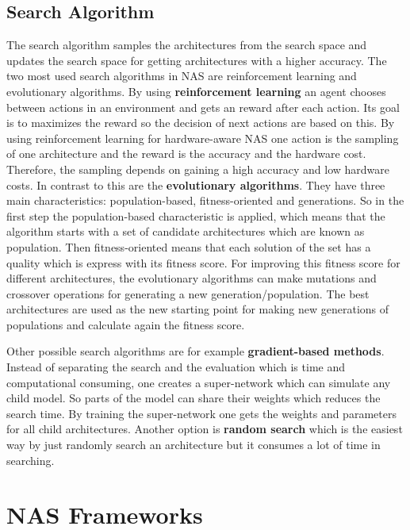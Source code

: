 \documentclass[conference]{IEEEtran}
\begin{document}
\subsection{Search Algorithm}
The search algorithm samples the architectures from the search space and updates the search space for getting architectures with a higher accuracy.
The two most used search algorithms in NAS are reinforcement learning and evolutionary algorithms. By using \textbf{reinforcement learning} an agent chooses between actions in an environment and gets an reward after each action. Its goal is to maximizes the reward so the decision of next actions are based on this. By using reinforcement learning for hardware-aware NAS one action is the sampling of one architecture and the reward is the accuracy and the hardware cost. Therefore, the sampling depends on gaining a high accuracy and low hardware costs. In contrast to this are the \textbf{evolutionary algorithms}. They have three main characteristics: population-based, fitness-oriented and generations. So in the first step the population-based characteristic is applied, which means that the algorithm starts with a set of candidate architectures which are known as population. Then fitness-oriented means that each solution of the set has a quality which is express with its fitness score. For improving this fitness score for different architectures, the evolutionary algorithms can make mutations and crossover operations for generating a new generation/population. The best architectures are used as the new starting point for making new generations of populations and calculate again the fitness score. 

Other possible search algorithms are for example \textbf{gradient-based methods}. Instead of separating the search and the evaluation which is time and computational consuming, one creates a super-network which can simulate any child model. So parts of the model can share their weights which reduces the search time. By training the super-network one gets the weights and parameters for all child architectures. Another option is \textbf{random search} which is the easiest way by just randomly search an architecture but it consumes a lot of time in searching. 

\section{NAS Frameworks}
\label{section:Frameworks}
\end{document}

